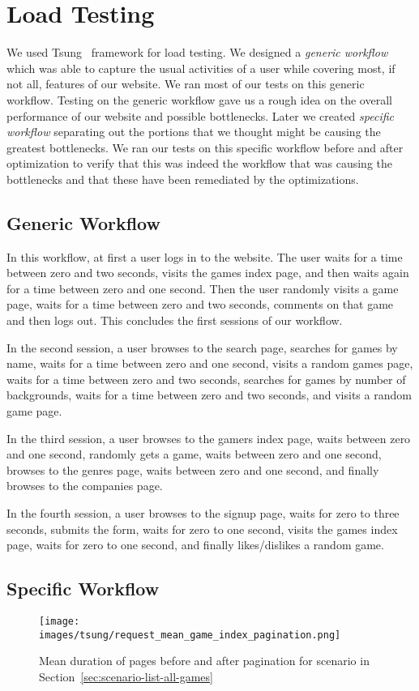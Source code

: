\chapter{Load Testing}
We used Tsung~\cite{tsung} framework for load testing. We designed a \textit{generic workflow} which was able to capture the usual activities of a user while covering most, if not all, features of our website. We ran most of our tests on this generic workflow. Testing on the generic workflow gave us a rough idea on the overall performance of our website and possible bottlenecks. Later we created \textit{specific workflow} separating out the portions that we thought might be causing the greatest bottlenecks. We ran our tests on this specific workflow before and after optimization to verify that this was indeed the workflow that was causing the bottlenecks and that these have been remediated by the optimizations.
\section{Generic Workflow}\label{sec:generic-workflow}
In this workflow, at first a user logs in to the website. The user waits for a time between zero and two seconds, visits the games index page, and then waits again for a time between zero and one second. Then the user randomly visits a game page, waits for a time between zero and two seconds, comments on that game and then logs out. This concludes the first sessions of our workflow. 

In the second session, a user browses to the search page, searches for games by name, waits for a time between zero and one second, visits a random games page, waits for a time between zero and two seconds, searches for games by number of backgrounds, waits for a time between zero and two seconds, and visits a random game page. 

In the third session, a user browses to the gamers index page, waits between zero and one second, randomly gets a game, waits between zero and one second, browses to the genres page, waits between zero and one second, and finally browses to the companies page.

In the fourth session, a user browses to the signup page, waits for zero to three seconds, submits the form, waits for zero to one second, visits the games index page, waits for zero to one second, and finally likes/dislikes a random game.

\section{Specific Workflow}\label{sec:specific-workflow}

\begin{figure}
\centering
\texttt{[image: images/tsung/request\_mean\_game\_index\_pagination.png]}
\caption{Mean duration of pages before and after pagination for scenario in Section~\ref{sec:scenario-list-all-games}}\label{fig:effect-of-pagination-on-game-list}
\end{figure}
